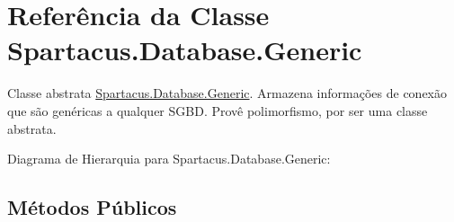 \hypertarget{classSpartacus_1_1Database_1_1Generic}{\section{Referência da Classe Spartacus.\+Database.\+Generic}
\label{classSpartacus_1_1Database_1_1Generic}
}


Classe abstrata \hyperlink{classSpartacus_1_1Database_1_1Generic}{Spartacus.\+Database.\+Generic}. Armazena informações de conexão que são genéricas a qualquer S\+G\+B\+D. Provê polimorfismo, por ser uma classe abstrata.  




Diagrama de Hierarquia para Spartacus.\+Database.\+Generic\+:
\subsection*{Métodos Públicos}
